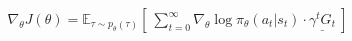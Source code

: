 \begin{align}\boxed{
\nabla_\theta J(\theta) = \mathbb{E}_{\tau\sim p_\theta(\tau)} \left\lbrack\ \sum_{t=0}^{\infty} \nabla_\theta\log \pi_\theta(a_t|s_t)\cdot \underline{\gamma^t G_t} \ \right\rbrack
}\end{align}